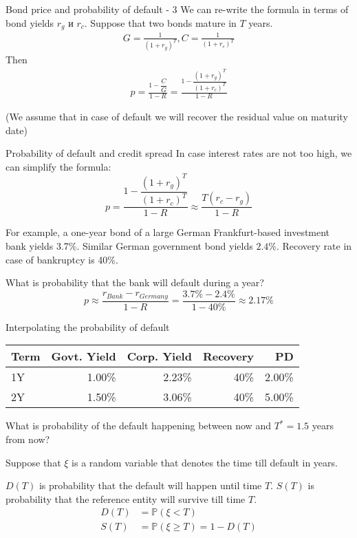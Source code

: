 \documentclass{beamer}
\begin{document}
\begin{frame}{Bond price and probability of default - 3}
\justify
We can re-write the formula in terms of bond yields $r_g$ и $r_c$. Suppose that two bonds mature in $T$ years.
\begin{align*}
G = \frac{1}{(1 + r_g)^T}, C = \frac{1}{(1 + r_c)^T}
\end{align*}
Then
\begin{align*}
p = \frac{1 - \dfrac{C}{G}}{1-R} = \frac{1 - \dfrac{(1 + r_g)^T}{(1 + r_c)^T}}{1 - R}
\end{align*}

\justify
(We assume that in case of default we will recover the residual value on maturity date)
\end{frame}



\begin{frame}{Probability of default and credit spread}
\justify
In case interest rates are not too high, we can simplify the formula:
\begin{equation*}
p = \frac{1 - \dfrac{(1 + r_g)^T}{(1 + r_c)^T}}{1 - R} \approx \frac{T(r_c - r_g)}{1 - R}
\end{equation*}

\justify
For example, a one-year bond of a large German Frankfurt-based investment bank yields 3.7\%. Similar German government bond yields $2.4\%$. Recovery rate in case of bankruptcy is 40\%.

\justify
What is probability that the bank will default during a year?
\begin{equation*}
p \approx \frac{r_{Bank} - r_{Germany}}{1-R} = \frac{3.7\% - 2.4\%}{1-40\%} \approx 2.17\%
\end{equation*}
\end{frame}



\begin{frame}{Interpolating the probability of default}
\centering
\begin{tabular}{l|r|r|r|r}
Term & Govt. Yield & Corp. Yield & Recovery & PD \\ \hline
1Y & 1.00\% & 2.23\% & 40\% & 2.00\% \\
2Y & 1.50\% & 3.06\% & 40\% & 5.00\%
\end{tabular}

\justify
What is probability of the default happening between now and $T^*=1.5$ years from now?

\justify
Suppose that $\xi$ is a random variable that denotes the time till default in years.

\justify
$D(T)$ is probability that the default will happen until time $T$. $S(T)$ is probability that the reference entity will survive till time $T$.
\begin{align*}
D(T) &= \mathbb{P}(\xi < T) \\
S(T) &= \mathbb{P}(\xi \ge T) = 1 - D(T)
\end{align*}
\end{frame}
 
\end{document}
